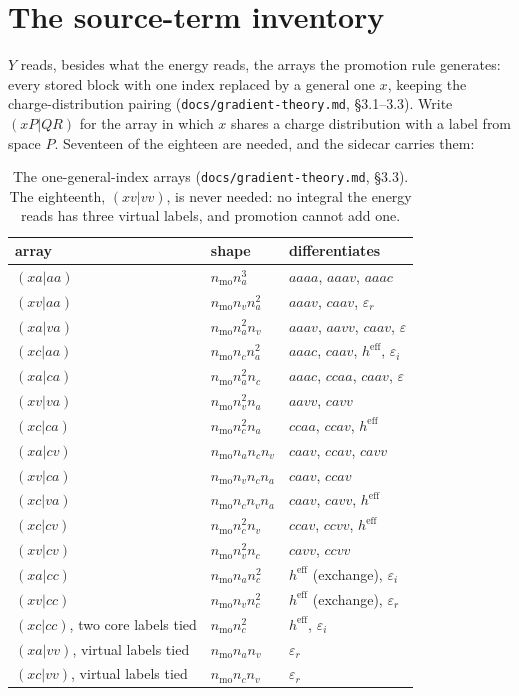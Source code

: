 \documentclass[11pt]{article}
\newcommand{\code}[1]{\texttt{#1}}
\newcommand{\eps}{\varepsilon}
\newcommand{\heff}{h^{\mathrm{eff}}}
\begin{document}
\appendix
\section{The source-term inventory}
\label{app:inventory}

$Y$ reads, besides what the energy reads, the arrays the promotion rule
generates: every stored block with one index replaced by a general one $x$,
keeping the charge-distribution pairing (\code{docs/gradient-theory.md},
\S3.1--3.3). Write $(xP|QR)$ for the array in which $x$ shares a charge
distribution with a label from space $P$. Seventeen of the eighteen are
needed, and the sidecar carries them:

\begin{table}[htbp]
\centering
\small
\begin{tabular}{@{}lll@{}}
\toprule
array & shape & differentiates \\
\midrule
$(xa|aa)$ & $n_{\mathrm{mo}}n_a^3$ & $aaaa$, $aaav$, $aaac$ \\
$(xv|aa)$ & $n_{\mathrm{mo}}n_vn_a^2$ & $aaav$, $caav$, $\eps_r$ \\
$(xa|va)$ & $n_{\mathrm{mo}}n_a^2n_v$ & $aaav$, $aavv$, $caav$, $\eps$ \\
$(xc|aa)$ & $n_{\mathrm{mo}}n_cn_a^2$ & $aaac$, $caav$, $\heff$, $\eps_i$ \\
$(xa|ca)$ & $n_{\mathrm{mo}}n_a^2n_c$ & $aaac$, $ccaa$, $caav$, $\eps$ \\
$(xv|va)$ & $n_{\mathrm{mo}}n_v^2n_a$ & $aavv$, $cavv$ \\
$(xc|ca)$ & $n_{\mathrm{mo}}n_c^2n_a$ & $ccaa$, $ccav$, $\heff$ \\
$(xa|cv)$ & $n_{\mathrm{mo}}n_an_cn_v$ & $caav$, $ccav$, $cavv$ \\
$(xv|ca)$ & $n_{\mathrm{mo}}n_vn_cn_a$ & $caav$, $ccav$ \\
$(xc|va)$ & $n_{\mathrm{mo}}n_cn_vn_a$ & $caav$, $cavv$, $\heff$ \\
$(xc|cv)$ & $n_{\mathrm{mo}}n_c^2n_v$ & $ccav$, $ccvv$, $\heff$ \\
$(xv|cv)$ & $n_{\mathrm{mo}}n_v^2n_c$ & $cavv$, $ccvv$ \\
$(xa|cc)$ & $n_{\mathrm{mo}}n_an_c^2$ & $\heff$ (exchange), $\eps_i$ \\
$(xv|cc)$ & $n_{\mathrm{mo}}n_vn_c^2$ & $\heff$ (exchange), $\eps_r$ \\
$(xc|cc)$, two core labels tied & $n_{\mathrm{mo}}n_c^2$ & $\heff$, $\eps_i$ \\
$(xa|vv)$, virtual labels tied & $n_{\mathrm{mo}}n_an_v$ & $\eps_r$ \\
$(xc|vv)$, virtual labels tied & $n_{\mathrm{mo}}n_cn_v$ & $\eps_r$ \\
\bottomrule
\end{tabular}
\caption{The one-general-index arrays (\code{docs/gradient-theory.md}, \S3.3).
The eighteenth, $(xv|vv)$, is never needed: no integral the energy reads has
three virtual labels, and promotion cannot add one.}
\label{tab:inventory}
\end{table}
\end{document}

